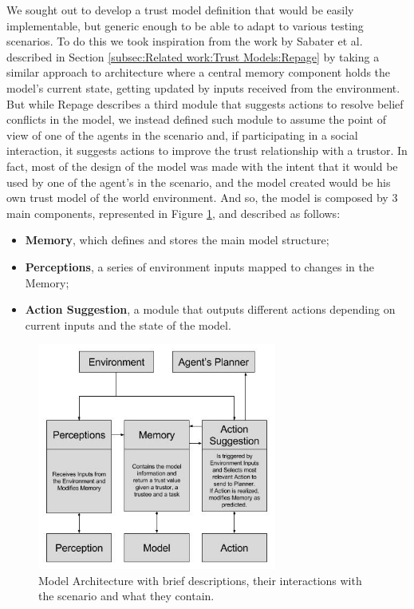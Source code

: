 \label{chap:TrustModel}

We sought out to develop a trust model definition that would be easily implementable, but generic enough to be able to adapt to various testing scenarios. To do this we took inspiration from the work by Sabater et al.\cite{Sabater2006} described in Section \ref{subsec:Related work:Trust Models:Repage} by taking a similar approach to architecture where a central memory component holds the model's current state, getting updated by inputs received from the environment. But while Repage describes a third module that suggests actions to resolve belief conflicts in the model, we instead defined such module to assume the point of view of one of the agents in the scenario and, if participating in a social interaction, it suggests actions to improve the trust relationship with a trustor. In fact, most of the design of the model was made with the intent that it would be used by one of the agent's in the scenario, and the model created would be his own trust model of the world environment. And so, the model is composed by 3 main components, represented in Figure \ref{fig:ModelArchitecture}, and described as follows:
\begin{itemize}
    \item \textbf{Memory}, which defines and stores the main model structure;
    \item \textbf{Perceptions}, a series of environment inputs mapped to changes in the Memory;
    \item \textbf{Action Suggestion}, a module that outputs different actions depending on current inputs and the state of the model.
\end{itemize}

\begin{figure}[hbt]
    \centering
    \includegraphics[width=0.7\textwidth]{figures/ModelDiagram.jpg}
    \caption{Model Architecture with brief descriptions, their interactions with the scenario and what they contain.}
    \label{fig:ModelArchitecture}
\end{figure}


